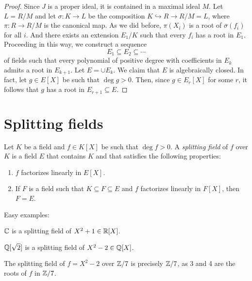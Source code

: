 \begin{proof}
    Since $J$ is a proper ideal, it is contained in a maximal ideal $M$. Let $L=R/M$ 
    and let $\sigma\colon K\to L$ be the composition $K\hookrightarrow R\to R/M=L$, 
    where $\pi\colon R\to R/M$ is the canonical map.  
    As we did before,
    $\pi(X_i)$ is a root of $\overline{\sigma}(f_i)$ for all $i$. And 
    there exists an extension $E_1/K$ such that
    every $f_i$ has a root in $E_1$. Proceeding in this way, we construct
    a sequence
    \[
    E_1\subseteq E_2\subseteq\cdots
    \]
    of fields such that every polynomial of positive degree with coefficients in $E_k$ 
    admits a root in $E_{k+1}$. Let $E=\cup E_k$. We claim that $E$ is algebraically closed. In fact, 
    let $g\in E[X]$ be such that $\deg g>0$. Then, since $g\in E_r[X]$ for some $r$, it follows
    that $g$ has a root in $E_{r+1}\subseteq E$. 
\end{proof}

\section{Splitting fields}


\begin{definition}
\label{def:splitting_field}
\label{def:decomposition_field}
	Let $K$ be a field and $f\in K[X]$ be such that $\deg f>0$. A \emph{splitting field} of $f$ over $K$ is a field $E$ that contains $K$ and that satisfies the following properties:
	\begin{enumerate}
		\item $f$ factorizes linearly in $E[X]$. 
		\item If $F$ is a field such that $K\subseteq F\subseteq E$ and 
			$f$ factorizes
			linearly in $F[X]$, then $F=E$. 
	\end{enumerate}
\end{definition}

Easy examples: 

\begin{example}
	$\mathbb{C}$ is a splitting field of $X^2+1\in\mathbb{R}[X]$. 
\end{example}

\begin{example}
	$\mathbb{Q}[\sqrt{2}]$ is a splitting field of $X^2-2\in\mathbb{Q}[X]$. 
\end{example}

\begin{example}
    The splitting field of $f=X^2-2$ over $\mathbb{Z}/7$ is 
    precisely $\mathbb{Z}/7$, as 3 and 4 are the roots of $f$ in $\mathbb{Z}/7$. 
\end{example}

